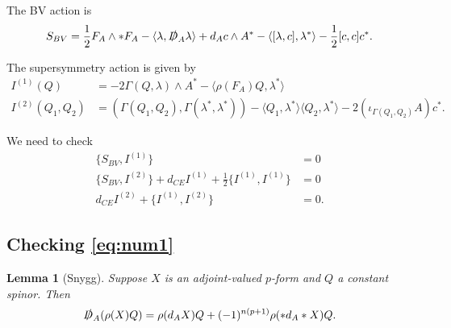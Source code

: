 \documentclass[12pt]{amsart}
\newcommand{\sD}{\slashed{D}}
\newtheorem{lm}[thm]{Lemma}
\begin{document}
The BV action is
\[S_{BV} = \frac{1}{2} F_A\wedge \ast F_A - \langle\lambda, \sD_A\lambda\rangle + d_A c \wedge A^* - \langle[\lambda, c], \lambda^*\rangle - \frac{1}{2}[c, c]c^*.\]

The supersymmetry action is given by
\begin{align*}
I^{(1)}(Q) &= -2\Gamma(Q, \lambda)\wedge A^* - \langle \rho(F_A) Q, \lambda^*\rangle \\
I^{(2)}(Q_1, Q_2) &= (\Gamma(Q_1, Q_2), \Gamma(\lambda^*, \lambda^*)) - \langle Q_1, \lambda^*\rangle \langle Q_2, \lambda^*\rangle - 2(\iota_{\Gamma(Q_1, Q_2)}A) c^*.
\end{align*}

We need to check
\begin{align}
\{S_{BV}, I^{(1)}\} &= 0 \label{eq:num1} \\
\{S_{BV}, I^{(2)}\} + d_{CE} I^{(1)} + \frac{1}{2}\{I^{(1)}, I^{(1)}\} &= 0 \label{eq:num2} \\
d_{CE} I^{(2)} + \{I^{(1)}, I^{(2)}\} &= 0. \label{eq:num3}
\end{align}

\subsection{Checking \eqref{eq:num1}}

\begin{lm}[Snygg]
Suppose $X$ is an adjoint-valued $p$-form and $Q$ a constant spinor. Then
\[\sD_A(\rho(X)Q) = \rho(d_A X) Q+ (-1)^{n(p+1)}\rho(\ast d_A \ast X) Q.\]
\label{lm:snygg}
\end{lm}
\end{document}
